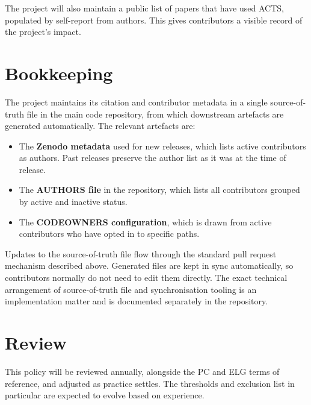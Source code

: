 \documentclass[11pt,a4paper]{article}
\begin{document}
The project will also maintain a public list of papers that have used ACTS,
populated by self-report from authors. This gives contributors a visible record of
the project's impact.

\section*{Bookkeeping}

The project maintains its citation and contributor metadata in a single
source-of-truth file in the main code repository, from which downstream artefacts
are generated automatically. The relevant artefacts are:

\begin{itemize}
    \item The \textbf{Zenodo metadata} used for new releases, which lists active
          contributors as authors. Past releases preserve the author list as it was
          at the time of release.
    \item The \textbf{AUTHORS file} in the repository, which lists all contributors
          grouped by active and inactive status.
    \item The \textbf{CODEOWNERS configuration}, which is drawn from active
          contributors who have opted in to specific paths.
\end{itemize}

Updates to the source-of-truth file flow through the standard pull request
mechanism described above. Generated files are kept in sync automatically, so
contributors normally do not need to edit them directly. The exact technical
arrangement of source-of-truth file and synchronisation tooling is an
implementation matter and is documented separately in the repository.

\section*{Review}

This policy will be reviewed annually, alongside the PC and ELG terms of reference,
and adjusted as practice settles. The thresholds and exclusion list in particular
are expected to evolve based on experience.
\end{document}
